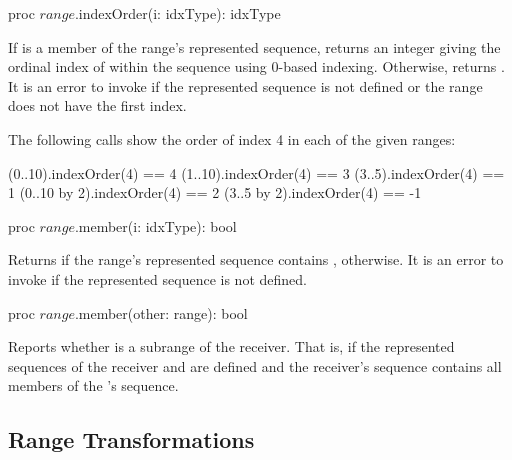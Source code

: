 \begin{protohead}
proc $range$.indexOrder(i: idxType): idxType
\end{protohead}
\begin{protobody}
If  is a member of the range's represented sequence, returns an integer giving
the ordinal index of  within the sequence using 0-based indexing.
Otherwise, returns .
It is an error to invoke  if the represented sequence
is not defined or the range does not have the first index.
\end{protobody}

\begin{example}
The following calls show the order of index 4 in each of the given
ranges:
\begin{chapel}
(0..10).indexOrder(4) == 4
(1..10).indexOrder(4) == 3
(3..5).indexOrder(4) == 1
(0..10 by 2).indexOrder(4) == 2
(3..5 by 2).indexOrder(4) == -1
\end{chapel}
\end{example}

\begin{protohead}
proc $range$.member(i: idxType): bool
\end{protohead}
\begin{protobody}
Returns  if the range's represented sequence
contains ,  otherwise.
It is an error to invoke  if the represented sequence
is not defined.
\end{protobody}

\begin{protohead}
proc $range$.member(other: range): bool
\end{protohead}
\begin{protobody}
Reports whether  is a subrange of the receiver. That is,
if the represented sequences of the receiver and 
are defined and the receiver's sequence contains all members of the
's sequence.
\end{protobody}

\subsection{Range Transformations}
\label{Range_Transformations}

